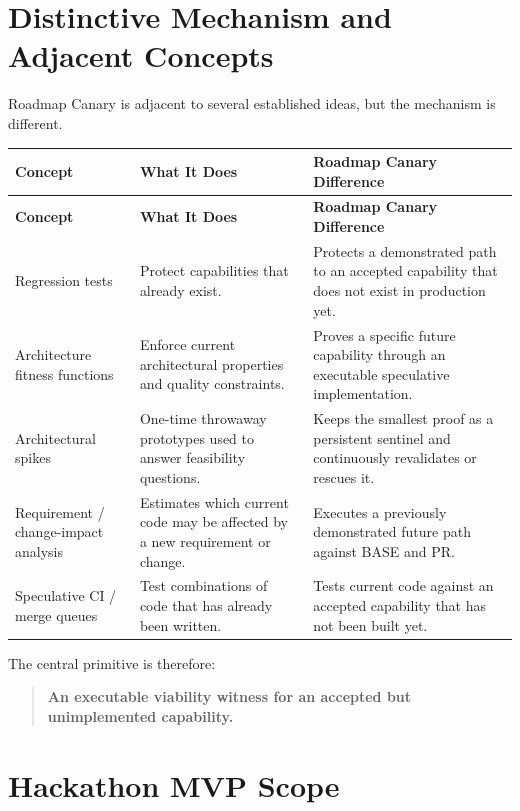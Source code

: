 \documentclass[12pt]{article}
\begin{document}
\section{Distinctive Mechanism and Adjacent Concepts}

Roadmap Canary is adjacent to several established ideas, but the mechanism is different.

\begin{longtable}{p{}p{}p{}}
\toprule
\textbf{Concept} & \textbf{What It Does} & \textbf{Roadmap Canary Difference} \\
\midrule
\endfirsthead
\toprule
\textbf{Concept} & \textbf{What It Does} & \textbf{Roadmap Canary Difference} \\
\midrule
\endhead
Regression tests & Protect capabilities that already exist. & Protects a demonstrated path to an accepted capability that does not exist in production yet. \\
\addlinespace
Architecture fitness functions & Enforce current architectural properties and quality constraints. & Proves a specific future capability through an executable speculative implementation. \\
\addlinespace
Architectural spikes & One-time throwaway prototypes used to answer feasibility questions. & Keeps the smallest proof as a persistent sentinel and continuously revalidates or rescues it. \\
\addlinespace
Requirement / change-impact analysis & Estimates which current code may be affected by a new requirement or change. & Executes a previously demonstrated future path against BASE and PR. \\
\addlinespace
Speculative CI / merge queues & Test combinations of code that has already been written. & Tests current code against an accepted capability that has not been built yet. \\
\bottomrule
\end{longtable}

The central primitive is therefore:

\begin{quote}
\textbf{An executable viability witness for an accepted but unimplemented capability.}
\end{quote}

\section{Hackathon MVP Scope}
\end{document}
